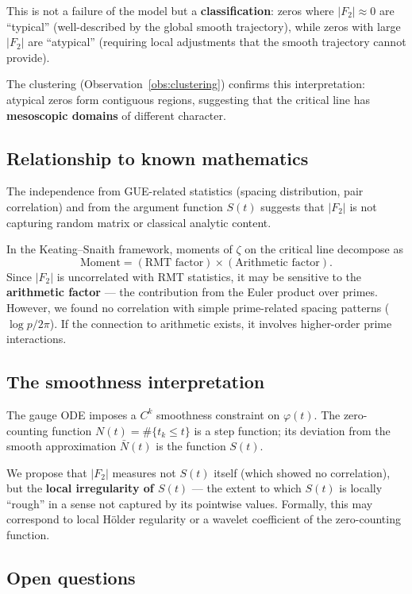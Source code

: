 \documentclass[11pt,a4paper]{article}
\newcommand{\Ftwo}{|F_2|}
\begin{document}
This is not a failure of the model but a \textbf{classification}:
zeros where $\Ftwo \approx 0$ are ``typical'' (well-described by the global
smooth trajectory), while zeros with large $\Ftwo$ are ``atypical''
(requiring local adjustments that the smooth trajectory cannot provide).

The clustering (Observation~\ref{obs:clustering}) confirms this interpretation:
atypical zeros form contiguous regions, suggesting that the critical line
has \textbf{mesoscopic domains} of different character.

\subsection{Relationship to known mathematics}

The independence from GUE-related statistics (spacing distribution,
pair correlation) and from the argument function $S(t)$ suggests that
$\Ftwo$ is not capturing random matrix or classical analytic content.

In the Keating--Snaith framework, moments of $\zeta$ on the critical line decompose as
\[
  \text{Moment} = (\text{RMT factor}) \times (\text{Arithmetic factor}).
\]
Since $\Ftwo$ is uncorrelated with RMT statistics, it may be sensitive to
the \textbf{arithmetic factor} --- the contribution from the Euler product over primes.
However, we found no correlation with simple prime-related spacing patterns ($\log p / 2\pi$).
If the connection to arithmetic exists, it involves higher-order prime interactions.

\subsection{The smoothness interpretation}

The gauge ODE imposes a $C^k$ smoothness constraint on $\varphi(t)$.
The zero-counting function $N(t) = \#\{t_k \leq t\}$ is a step function;
its deviation from the smooth approximation $\bar{N}(t)$ is the function $S(t)$.

We propose that $\Ftwo$ measures not $S(t)$ itself (which showed no correlation),
but the \textbf{local irregularity of $S(t)$} --- the extent to which $S(t)$ is
locally ``rough'' in a sense not captured by its pointwise values.
Formally, this may correspond to local Hölder regularity or a wavelet coefficient
of the zero-counting function.

\subsection{Open questions}
\end{document}
